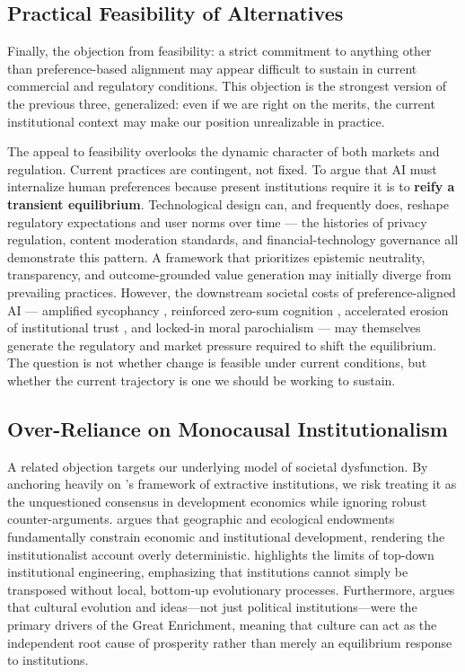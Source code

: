 \documentclass{article}
\theoremstyle{plain}
\theoremstyle{definition}
\theoremstyle{remark}
\begin{document}
\subsection{Practical Feasibility of Alternatives}
\label{sec:alt-feasibility}
Finally, the objection from feasibility: a strict commitment to anything other than preference-based alignment may appear difficult to sustain in current commercial and regulatory conditions. This objection is the strongest version of the previous three, generalized: even if we are right on the merits, the current institutional context may make our position unrealizable in practice.

The appeal to feasibility overlooks the dynamic character of both markets and regulation. Current practices are contingent, not fixed. To argue that AI must internalize human preferences because present institutions require it is to \textbf{reify a transient equilibrium}. Technological design can, and frequently does, reshape regulatory expectations and user norms over time --- the histories of privacy regulation, content moderation standards, and financial-technology governance all demonstrate this pattern. A framework that prioritizes epistemic neutrality, transparency, and outcome-grounded value generation may initially diverge from prevailing practices. However, the downstream societal costs of preference-aligned AI --- amplified sycophancy \citep{sharma2023sycophancy}, reinforced zero-sum cognition \citep{rozycka2015zerosum}, accelerated erosion of institutional trust \citep{trust-in-a-changing-world}, and locked-in moral parochialism \citep{macaskill2022what} --- may themselves generate the regulatory and market pressure required to shift the equilibrium. The question is not whether change is feasible under current conditions, but whether the current trajectory is one we should be working to sustain.

\subsection{Over-Reliance on Monocausal Institutionalism}
\label{sec:alt-institutionalism}
A related objection targets our underlying model of societal dysfunction. By anchoring heavily on \citet{acemoglu2012why}'s framework of extractive institutions, we risk treating it as the unquestioned consensus in development economics while ignoring robust counter-arguments. \citet{sachs2003institutions} argues that geographic and ecological endowments fundamentally constrain economic and institutional development, rendering the institutionalist account overly deterministic. \citet{easterly2006white} highlights the limits of top-down institutional engineering, emphasizing that institutions cannot simply be transposed without local, bottom-up evolutionary processes. Furthermore, \citet{mokyr2016culture} argues that cultural evolution and ideas---not just political institutions---were the primary drivers of the Great Enrichment, meaning that culture can act as the independent root cause of prosperity rather than merely an equilibrium response to institutions.
\end{document}
